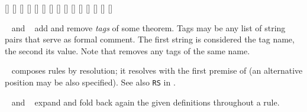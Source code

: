 \begin{isabellebody}
\begin{isamarkuptext}
  \begin{railoutput}
[]
[]
[]
\rail@end
{}
[]
[]
\rail@end
{}
[]
\rail@bar
{}
[]
[]
[]
\rail@endbar
{}[]
\rail@end
{}
\rail@bar
{}[]
[]
\rail@endbar
{}[]
\rail@end
{}
[]
\rail@bar
{}
[]
\rail@endbar
\rail@end
\end{railoutput}


  \begin{description}

  \item \hyperlink{attribute.tagged}{\mbox{}}~ and \hyperlink{attribute.untagged}{\mbox{}}~ add and remove \emph{tags} of some theorem.
  Tags may be any list of string pairs that serve as formal comment.
  The first string is considered the tag name, the second its value.
  Note that \hyperlink{attribute.untagged}{\mbox{}} removes any tags of the same name.

  \item \hyperlink{attribute.THEN}{\mbox{}}~ composes rules by resolution; it
  resolves with the first premise of  (an alternative
  position may be also specified).  See also \verb|RS| in
  \cite{isabelle-implementation}.
  
  \item \hyperlink{attribute.unfolded}{\mbox{}}~ and \hyperlink{attribute.folded}{\mbox{}}~ expand and fold back again the given
  definitions throughout a rule.


\end{description}
\end{isamarkuptext}
\end{isabellebody}
